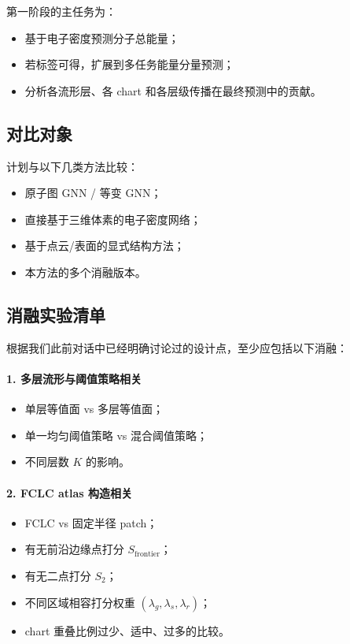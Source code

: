 \documentclass[12pt,a4paper]{ctexart}
\begin{document}
第一阶段的主任务为：
\begin{itemize}[leftmargin=2em]
    \item 基于电子密度预测分子总能量；
    \item 若标签可得，扩展到多任务能量分量预测；
    \item 分析各流形层、各 chart 和各层级传播在最终预测中的贡献。
\end{itemize}

\subsection{对比对象}

计划与以下几类方法比较：
\begin{itemize}[leftmargin=2em]
    \item 原子图 GNN / 等变 GNN；
    \item 直接基于三维体素的电子密度网络；
    \item 基于点云/表面的显式结构方法；
    \item 本方法的多个消融版本。
\end{itemize}

\subsection{消融实验清单}

根据我们此前对话中已经明确讨论过的设计点，至少应包括以下消融：

\paragraph{1. 多层流形与阈值策略相关}
\begin{itemize}[leftmargin=2em]
    \item 单层等值面 vs 多层等值面；
    \item 单一均匀阈值策略 vs 混合阈值策略；
    \item 不同层数 \(K\) 的影响。
\end{itemize}

\paragraph{2. FCLC atlas 构造相关}
\begin{itemize}[leftmargin=2em]
    \item FCLC vs 固定半径 patch；
    \item 有无前沿边缘点打分 \(S_{\mathrm{frontier}}\)；
    \item 有无二点打分 \(S_2\)；
    \item 不同区域相容打分权重 \((\lambda_g,\lambda_s,\lambda_r)\)；
    \item chart 重叠比例过少、适中、过多的比较。
\end{itemize}
\end{document}
